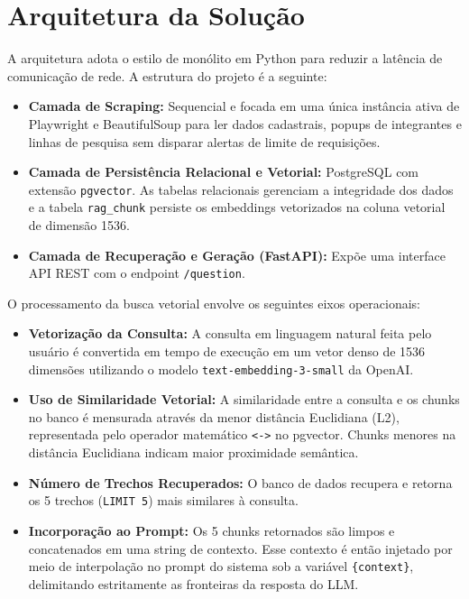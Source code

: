 \documentclass[12pt,a4paper]{article}
\begin{document}
\section{Arquitetura da Solução}
A arquitetura adota o estilo de monólito em Python para reduzir a latência de comunicação de rede. A estrutura do projeto é a seguinte:
\begin{itemize}
    \item \textbf{Camada de Scraping:} Sequencial e focada em uma única instância ativa de Playwright e BeautifulSoup para ler dados cadastrais, popups de integrantes e linhas de pesquisa sem disparar alertas de limite de requisições.
    \item \textbf{Camada de Persistência Relacional e Vetorial:} PostgreSQL com extensão \texttt{pgvector}. As tabelas relacionais gerenciam a integridade dos dados e a tabela \texttt{rag\_chunk} persiste os embeddings vetorizados na coluna vetorial de dimensão 1536.
    \item \textbf{Camada de Recuperação e Geração (FastAPI):} Expõe uma interface API REST com o endpoint \texttt{/question}.
\end{itemize}

O processamento da busca vetorial envolve os seguintes eixos operacionais:
\begin{itemize}
    \item \textbf{Vetorização da Consulta:} A consulta em linguagem natural feita pelo usuário é convertida em tempo de execução em um vetor denso de 1536 dimensões utilizando o modelo \texttt{text-embedding-3-small} da OpenAI.
    \item \textbf{Uso de Similaridade Vetorial:} A similaridade entre a consulta e os chunks no banco é mensurada através da menor distância Euclidiana (L2), representada pelo operador matemático \texttt{<->} no pgvector. Chunks menores na distância Euclidiana indicam maior proximidade semântica.
    \item \textbf{Número de Trechos Recuperados:} O banco de dados recupera e retorna os 5 trechos (\texttt{LIMIT 5}) mais similares à consulta.
    \item \textbf{Incorporação ao Prompt:} Os 5 chunks retornados são limpos e concatenados em uma string de contexto. Esse contexto é então injetado por meio de interpolação no prompt do sistema sob a variável \texttt{\{context\}}, delimitando estritamente as fronteiras da resposta do LLM.
\end{itemize}
\end{document}
